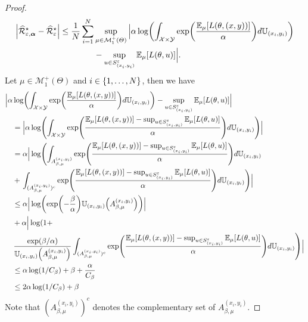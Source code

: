 \begin{proof}
\begin{align*}
 \Big| \widehat{\mathcal{R}}_{\varepsilon,\bm{\alpha}}^{\star} - \widehat{\mathcal{R}}_{\varepsilon}^{\star}\Big|\leq \frac{1}{\numsamples}\sum_{i=1}^\numsamples&\sup_{\mu\in\mathcal{M}_1^{+}(\Theta)}\Big|\alpha\log\left(\int_{\mathcal{X}\times\mathcal{Y}}\exp\left(\frac{\mathbb{E}_{\mu}[\loss(\theta,(x,y))]}{\alpha} \right) d\mathbb{U}_{(x_i,y_i)}\right)\\
 &-\sup_{u\in S^{\varepsilon}_{(x_i,y_i)}}\mathbb{E}_{\mu}[\loss(\theta,u)] \Big|.
\end{align*}
Let $\mu\in\mathcal{M}_1^{+}(\Theta)$ and $i\in\{1,\dots,N\}$, then we have
\begin{align*}
 \Big|\alpha&\log\left(\int_{\mathcal{X}\times\mathcal{Y}}\exp\left(\frac{\mathbb{E}_{\mu}[\loss(\theta,(x,y))]}{\alpha} \right) d\mathbb{U}_{(x_i,y_i)}\right)-\sup_{u\in S^{\varepsilon}_{(x_i,y_i)}}\mathbb{E}_{\mu}[\loss(\theta,u)] \Big|\\
 &=\Big|\alpha\log\left(\int_{\mathcal{X}\times\mathcal{Y}}\exp\left(\frac{\mathbb{E}_{\mu}[\loss(\theta,(x,y))]-\sup_{u\in S^{\varepsilon}_{(x_i,y_i)}}\mathbb{E}_{\mu}[\loss(\theta,u)]}{\alpha} \right) d\mathbb{U}_{(x_i,y_i)}\right) \Big|  \\
 &=\alpha  \Big| \log\left(\int_{A_{\beta,\mu}^{(x_i,y_i)}}\exp\left(\frac{\mathbb{E}_{\mu}[\loss(\theta,(x,y))]-\sup_{u\in S^{\varepsilon}_{(x_i,y_i)}}\mathbb{E}_{\mu}[\loss(\theta,u)]}{\alpha} \right) d\mathbb{U}_{(x_i,y_i)}\right. \\
 &+ \left.\int_{(A_{\beta,\mu}^{(x_i,y_i)})^{c}}\exp\left(\frac{\mathbb{E}_{\mu}[\loss(\theta,(x,y))]-\sup_{u\in S^{\varepsilon}_{(x_i,y_i)}}\mathbb{E}_{\mu}[\loss(\theta,u)]}{\alpha} \right) d\mathbb{U}_{(x_i,y_i)}\right)  \Big|\\
 &\leq \alpha \Big | \log\left(\exp(-\frac\beta\alpha)\mathbb{U}_{(x_i,y_i)}\left(A_{\beta,\mu}^{(x_i,y_i)}\right) \right)\Big | \\
 &+ \alpha  \Big|\log\left(1+\right.\\
 &\left.\frac{\exp(\beta/\alpha)}{\mathbb{U}_{(x_i,y_i)}\left(A_{\beta,\mu}^{(x_i,y_i)}\right)}\int_{(A_{\beta,\mu}^{(x_i,y_i)})^{c}}\exp\left(\frac{\mathbb{E}_{\mu}[\loss(\theta,(x,y))]-\sup_{u\in S^{\varepsilon}_{(x_i,y_i)}}\mathbb{E}_{\mu}[\loss(\theta,u)]}{\alpha} \right) d\mathbb{U}_{(x_i,y_i)}\right)  \Big|\\
 &\leq \alpha\log(1/C_\beta)+\beta +\frac{\alpha}{C_\beta}\\
 &\leq 2\alpha\log(1/C_\beta)+\beta
\end{align*}
Note that $(A_{\beta,\mu}^{(x_i,y_i)})^{c}$ denotes the complementary set of $A_{\beta,\mu}^{(x_i,y_i)}$.
\end{proof}



